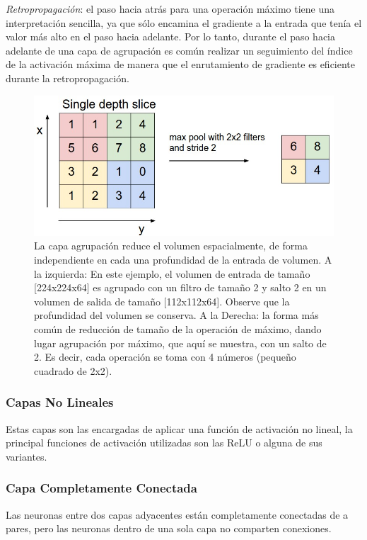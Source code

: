 \documentclass[a4paper,11pt,spanish]{book}
\begin{document}
	\emph{Retropropagación}: el paso hacia atrás para una operación máximo tiene una interpretación sencilla, ya que sólo encamina el gradiente a la entrada que tenía el valor más alto
	en el paso hacia adelante. Por lo tanto, durante el paso hacia adelante de una capa de agrupación es común realizar un seguimiento del índice de la activación máxima de
	manera que el enrutamiento de gradiente es eficiente durante la retropropagación.

	\begin{figure}[H]
	  \begin{center}
	   \includegraphics[width=0.8\linewidth]{./img/stanford_maxpool.jpeg}
	  \end{center}
	  \caption{La capa agrupación reduce el volumen espacialmente, de forma independiente en cada una profundidad de la entrada de volumen.
	    A la izquierda: En este ejemplo, el volumen de entrada de tamaño [224x224x64] es agrupado con un filtro de tamaño 2 y salto 2 en un volumen de salida de tamaño [112x112x64].
	    Observe que la profundidad del volumen se conserva. A la Derecha: la forma más común de reducción de tamaño de la operación de máximo, dando lugar agrupación por máximo,
	    que aquí se muestra, con un salto de 2. Es decir, cada operación se toma con 4 números (pequeño cuadrado de 2x2). \cite{Karpathy:Stanford}}
	  \label{fig:maxpool_layer}
	\end{figure}

      \subsubsection{Capas No Lineales}
	Estas capas son las encargadas de aplicar una función de activación no lineal, la principal funciones de activación utilizadas son las ReLU o alguna de sus variantes.

      \subsubsection{Capa Completamente Conectada}
	Las neuronas entre dos capas adyacentes están completamente conectadas de a pares, pero las neuronas dentro de una sola capa no comparten conexiones.
\end{document}
